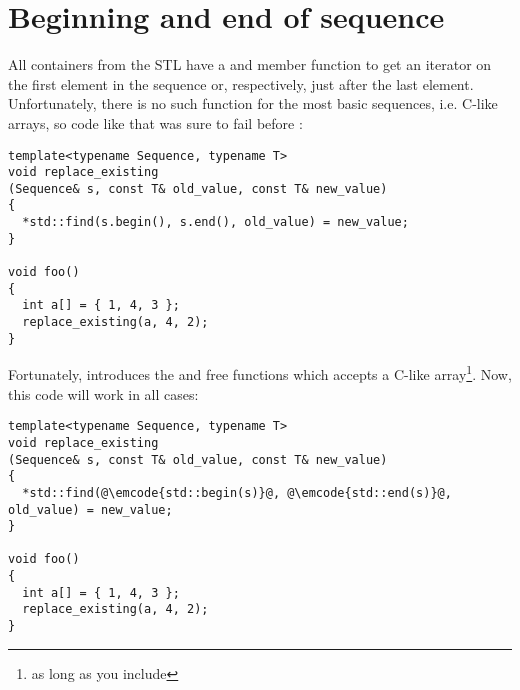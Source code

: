 \section{Beginning and end of sequence}

All containers from the STL have a  and 
member function to get an iterator on the first element in the
sequence or, respectively, just after the last element. Unfortunately,
there is no such function for the most basic sequences, i.e. C-like
arrays, so code like that was sure to fail before :

\begin{lstlisting}
template<typename Sequence, typename T>
void replace_existing
(Sequence& s, const T& old_value, const T& new_value)
{
  *std::find(s.begin(), s.end(), old_value) = new_value;
}

void foo()
{
  int a[] = { 1, 4, 3 };
  replace_existing(a, 4, 2);
}
\end{lstlisting}

Fortunately,  introduces the  and
 free functions which accepts a C-like
array\footnote{as long as you include
  }. Now, this code will work in
all cases:

\begin{lstlisting}
template<typename Sequence, typename T>
void replace_existing
(Sequence& s, const T& old_value, const T& new_value)
{
  *std::find(@\emcode{std::begin(s)}@, @\emcode{std::end(s)}@, old_value) = new_value;
}

void foo()
{
  int a[] = { 1, 4, 3 };
  replace_existing(a, 4, 2);
}
\end{lstlisting}
